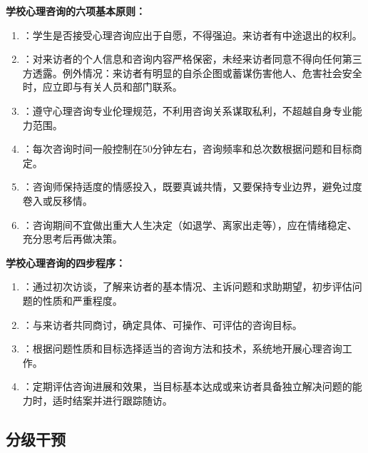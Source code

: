 \begin{keybox}
\textbf{学校心理咨询的六项基本原则：}

\begin{enumerate}[leftmargin=*]
    \item {}：学生是否接受心理咨询应出于自愿，不得强迫。来访者有中途退出的权利。
    \item {}：对来访者的个人信息和咨询内容严格保密，未经来访者同意不得向任何第三方透露。例外情况：来访者有明显的自杀企图或蓄谋伤害他人、危害社会安全时，应立即与有关人员和部门联系。
    \item {}：遵守心理咨询专业伦理规范，不利用咨询关系谋取私利，不超越自身专业能力范围。
    \item {}：每次咨询时间一般控制在50分钟左右，咨询频率和总次数根据问题和目标商定。
    \item {}：咨询师保持适度的情感投入，既要真诚共情，又要保持专业边界，避免过度卷入或反移情。
    \item {}：咨询期间不宜做出重大人生决定（如退学、离家出走等），应在情绪稳定、充分思考后再做决策。
\end{enumerate}

\textbf{学校心理咨询的四步程序：}

\begin{enumerate}[leftmargin=*]
    \item {}：通过初次访谈，了解来访者的基本情况、主诉问题和求助期望，初步评估问题的性质和严重程度。
    \item {}：与来访者共同商讨，确定具体、可操作、可评估的咨询目标。
    \item {}：根据问题性质和目标选择适当的咨询方法和技术，系统地开展心理咨询工作。
    \item {}：定期评估咨询进展和效果，当目标基本达成或来访者具备独立解决问题的能力时，适时结案并进行跟踪随访。
\end{enumerate}
\end{keybox}

\subsection{分级干预}

